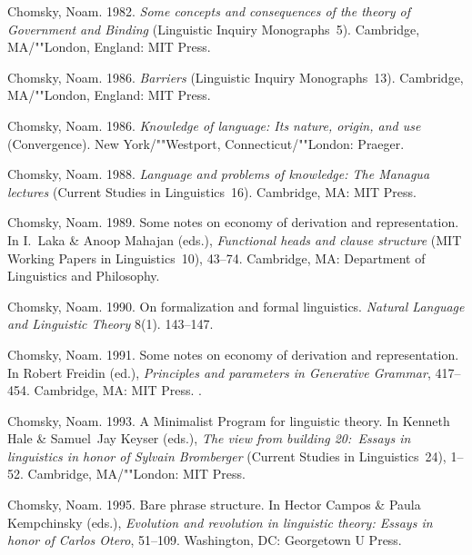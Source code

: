 \begin{thebibliography}{1420}
Chomsky, Noam. 1982.
\newblock \emph{Some concepts and consequences of the theory of {Government and
  Binding}} (Linguistic Inquiry Monographs~5).
\newblock Cambridge, MA/""London, England: MIT Press.

Chomsky, Noam. 1986{}.
\newblock \emph{Barriers} (Linguistic Inquiry Monographs~13).
\newblock Cambridge, MA/""London, England: MIT Press.

Chomsky, Noam. 1986{}.
\newblock \emph{Knowledge of language: {Its} nature, origin, and use}
  (Convergence).
\newblock New York/""Westport, Connecticut/""London: Praeger.

Chomsky, Noam. 1988.
\newblock \emph{Language and problems of knowledge: {The} {Managua} lectures}
  (Current Studies in Linguistics~16).
\newblock Cambridge, MA: MIT Press.

Chomsky, Noam. 1989.
\newblock Some notes on economy of derivation and representation.
\newblock In I.~Laka \& Anoop Mahajan (eds.), \emph{Functional heads and clause
  structure} (MIT Working Papers in Linguistics~10), 43--74. Cambridge, MA:
  Department of Linguistics and Philosophy.

Chomsky, Noam. 1990.
\newblock On formalization and formal linguistics.
\newblock \emph{Natural Language and Linguistic Theory} 8(1). 143--147.

Chomsky, Noam. 1991.
\newblock Some notes on economy of derivation and representation.
\newblock In Robert Freidin (ed.), \emph{Principles and parameters in
  {Generative Grammar}}, 417--454. Cambridge, MA: MIT Press.
\newblock \reprintas {}.

Chomsky, Noam. 1993.
\newblock A {Minimalist Program} for linguistic theory.
\newblock In Kenneth Hale \& Samuel~Jay Keyser (eds.), \emph{The view from
  building 20:\ {Essays} in linguistics in honor of {Sylvain Bromberger}}
  (Current Studies in Linguistics~24), 1--52. Cambridge, MA/""London: MIT
  Press.

Chomsky, Noam. 1995{}.
\newblock Bare phrase structure.
\newblock In Hector Campos \& Paula Kempchinsky (eds.), \emph{Evolution and
  revolution in linguistic theory: {Essays} in honor of {Carlos Otero}},
  51--109. Washington, DC: Georgetown U Press.


\end{thebibliography}

